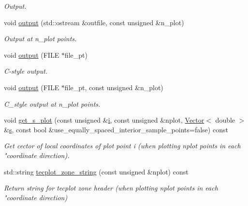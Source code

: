 \begin{DoxyCompactItemize}
\begin{DoxyCompactList}\small\item\em Output. \end{DoxyCompactList}\item 
void \hyperlink{classoomph_1_1QElement_3_012_00_01NNODE__1D_01_4_a865e3a77ee4cb67e7fcd7eca42d256f1}{output} (std\+::ostream \&outfile, const unsigned \&n\+\_\+plot)
\begin{DoxyCompactList}\small\item\em Output at n\+\_\+plot points. \end{DoxyCompactList}\item 
void \hyperlink{classoomph_1_1QElement_3_012_00_01NNODE__1D_01_4_a08e9ce84ba8787b25935f18c00996a5d}{output} (F\+I\+LE $\ast$file\+\_\+pt)
\begin{DoxyCompactList}\small\item\em C-\/style output. \end{DoxyCompactList}\item 
void \hyperlink{classoomph_1_1QElement_3_012_00_01NNODE__1D_01_4_aeaa407209398e3c0daf6968520d774ec}{output} (F\+I\+LE $\ast$file\+\_\+pt, const unsigned \&n\+\_\+plot)
\begin{DoxyCompactList}\small\item\em C\+\_\+style output at n\+\_\+plot points. \end{DoxyCompactList}\item 
void \hyperlink{classoomph_1_1QElement_3_012_00_01NNODE__1D_01_4_a7abbf874d0f96b26d2f6c337dc7f4526}{get\+\_\+s\+\_\+plot} (const unsigned \&\hyperlink{cfortran_8h_adb50e893b86b3e55e751a42eab3cba82}{i}, const unsigned \&nplot, \hyperlink{classoomph_1_1Vector}{Vector}$<$ double $>$ \&\hyperlink{cfortran_8h_ab7123126e4885ef647dd9c6e3807a21c}{s}, const bool \&use\+\_\+equally\+\_\+spaced\+\_\+interior\+\_\+sample\+\_\+points=false) const
\begin{DoxyCompactList}\small\item\em Get cector of local coordinates of plot point i (when plotting nplot points in each "coordinate direction). \end{DoxyCompactList}\item 
std\+::string \hyperlink{classoomph_1_1QElement_3_012_00_01NNODE__1D_01_4_ab2ec0de2b0e9d8c155a2f099346a9bc3}{tecplot\+\_\+zone\+\_\+string} (const unsigned \&nplot) const
\begin{DoxyCompactList}\small\item\em Return string for tecplot zone header (when plotting nplot points in each "coordinate direction) \end{DoxyCompactList}\item 

\end{DoxyCompactItemize}
